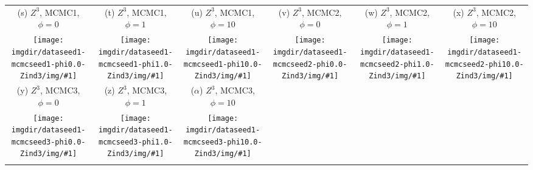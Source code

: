 {\begin{tabular}{cccccc}
    {\tiny (s) $Z^3$, MCMC1, $\phi=0$} &
    {\tiny (t) $Z^3$, MCMC1, $\phi=1$} &
    {\tiny (u) $Z^3$, MCMC1, $\phi=10$} &
    {\tiny (v) $Z^3$, MCMC2, $\phi=0$} &
    {\tiny (w) $Z^3$, MCMC2, $\phi=1$} &
    {\tiny (x) $Z^3$, MCMC2, $\phi=10$} \\
    \texttt{[image: \\imgdir/dataseed1-mcmcseed1-phi0.0-Zind3/img/\#1]} &
    \texttt{[image: \\imgdir/dataseed1-mcmcseed1-phi1.0-Zind3/img/\#1]} &
    \texttt{[image: \\imgdir/dataseed1-mcmcseed1-phi10.0-Zind3/img/\#1]} &
    \texttt{[image: \\imgdir/dataseed1-mcmcseed2-phi0.0-Zind3/img/\#1]} &
    \texttt{[image: \\imgdir/dataseed1-mcmcseed2-phi1.0-Zind3/img/\#1]} &
    \texttt{[image: \\imgdir/dataseed1-mcmcseed2-phi10.0-Zind3/img/\#1]} \\
    {\tiny (y) $Z^3$, MCMC3, $\phi=0$} &
    {\tiny (z) $Z^3$, MCMC3, $\phi=1$} &
    {\tiny ($\alpha$) $Z^3$, MCMC3, $\phi=10$} &
    & & \\
    \texttt{[image: \\imgdir/dataseed1-mcmcseed3-phi0.0-Zind3/img/\#1]} &
    \texttt{[image: \\imgdir/dataseed1-mcmcseed3-phi1.0-Zind3/img/\#1]} &
    \texttt{[image: \\imgdir/dataseed1-mcmcseed3-phi10.0-Zind3/img/\#1]} \\
    & & \\
  \end{tabular}
}
